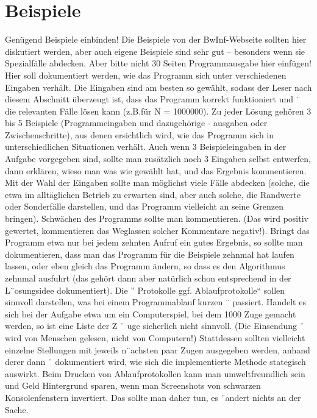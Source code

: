 \documentclass[a4paper,10pt,ngerman]{scrartcl}
\begin{document}
    \section{Beispiele}\label{sec:beispiele}
    Genügend Beispiele einbinden!
    Die Beispiele von der BwInf-Webseite sollten hier diskutiert werden,
    aber auch eigene Beispiele sind sehr gut – besonders wenn sie Spezialfälle abdecken.
    Aber bitte nicht 30 Seiten Programmausgabe hier einfügen!
    Hier soll dokumentiert werden, wie das Programm sich unter verschiedenen Eingaben verhält.
    Die Eingaben sind am besten so gewählt, sodass der Leser
    nach diesem Abschnitt überzeugt ist, dass das Programm korrekt funktioniert und ¨
    die relevanten Fälle lösen kann (z.B.für N = 1000000).
    Zu jeder Lösung gehören 3 bis 5 Beispiele (Programmeingaben und dazugehörige -
    ausgaben oder Zwischenschritte), aus denen ersichtlich wird, wie das Programm sich
    in unterschiedlichen Situationen verhält.
    Auch wenn 3 Beispieleingaben in der Aufgabe
    vorgegeben sind, sollte man zusätzlich noch 3 Eingaben selbst entwerfen, dann erklären,
    wieso man was wie gewählt hat, und das Ergebnis kommentieren.
    Mit der Wahl der Eingaben sollte man möglichst viele Fälle abdecken (solche, die etwa im alltäglichen Betrieb
    zu erwarten sind, aber auch solche, die Randwerte oder Sonderfälle darstellen, und das
    Programm vielleicht an seine Grenzen bringen).
    Schwächen des Programms sollte man kommentieren. (Das wird positiv gewertet,
    kommentieren das Weglassen solcher Kommentare negativ!).
    Bringt das Programm etwa nur bei jedem zehnten Aufruf ein gutes Ergebnis, so sollte man dokumentieren, dass man das
    Programm für die Beispiele zehnmal hat laufen lassen, oder eben gleich das Programm
    ändern, so dass es den Algorithmus zehnmal ausfuhrt (das gehört dann aber natürlich
    schon entsprechend in der L¨osungsidee dokumentiert).
    Die ” Protokolle ggf.
    Ablaufprotokolle“ sollen sinnvoll darstellen, was bei einem Programmablauf
    kurzen ¨ passiert.
    Handelt es sich bei der Aufgabe etwa um ein Computerspiel, bei dem 1000
    Zuge gemacht werden, so ist eine Liste der Z ¨ uge sicherlich nicht sinnvoll. (Die Einsendung ¨
    wird von Menschen gelesen, nicht von Computern!) Stattdessen sollten vielleicht einzelne
    Stellungen mit jeweils n¨achsten paar Zugen ausgegeben werden, anhand derer dann ¨
    dokumentiert wird, wie sich die implementierte Methode stategisch auswirkt.
    Beim Drucken von Ablaufprotokollen kann man umweltfreundlich sein und Geld
    Hintergrund sparen, wenn man Screenshots von schwarzen Konsolenfenstern invertiert. Das sollte
    man daher tun, es ¨andert nichts an der Sache.
\end{document}
